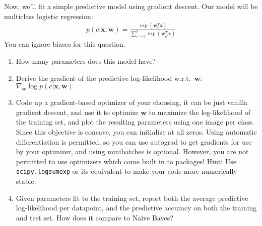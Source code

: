 \documentclass{harvardml}
\newcommand{\bx}{\mathbf{x}}
\newcommand{\bw}{\mathbf{w}}
\theoremstyle{plain}
\begin{document}
\begin{problem}

Now, we'll fit a simple predictive model using gradient descent.  Our model will be multiclass logistic regression:
\begin{align}
p(c | \bx, \bw) = \frac{\exp(\bw_c^T \bx)}{\sum_{c' = 0}^9 \exp(\bw_{c'}^T \bx)}
\end{align}
You can ignore biases for this question.
\begin{enumerate}[label=(\alph*)]
\item How many parameters does this model have?
\item Derive the gradient of the predictive log-likelihood w.r.t.\ $\bw$: $\nabla_{\bw} \log p(c | \bx, \bw)$
\item Code up a gradient-based optimizer of your choosing, it can be just vanilla gradient descent, and use it to optimize $\bw$ to maximize the log-likelihood of the training set, and plot the resulting parameters using one image per class.  Since this objective is concave, you can initialize at all zeros.  Using automatic differentiation is permitted, so you can use autograd to get gradients for use by your optimizer, and using minibatches is optional. However, you are not permitted to use optimizers which come built in to packages! Hint: Use \texttt{scipy.logsumexp} or its equivalent to make your code more numerically stable.
\item Given parameters fit to the training set, report both the average predictive log-likelihood per datapoint, and the predictive accuracy on both the training and test set.  How does it compare to Na\"ive Bayes?
\end{enumerate}
\end{problem}



\end{document}

